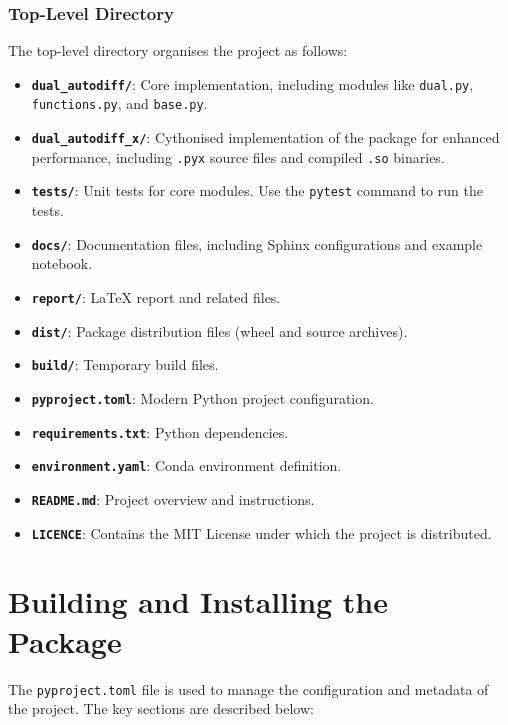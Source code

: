 \documentclass[a4paper,12pt]{article}
\begin{document}
    \subsubsection{Top-Level Directory}
    The top-level directory organises the project as follows:
    \begin{itemize}
        \item \textbf{\texttt{dual\_autodiff/}}: Core implementation, including modules like \texttt{dual.py}, \texttt{functions.py}, and \texttt{base.py}.
        \item \textbf{\texttt{dual\_autodiff\_x/}}: Cythonised implementation of the package for enhanced performance, including \texttt{.pyx} source files and compiled \texttt{.so} binaries.
        \item \textbf{\texttt{tests/}}: Unit tests for core modules. Use the \texttt{pytest} command to run the tests.
        \item \textbf{\texttt{docs/}}: Documentation files, including Sphinx configurations and example notebook.
        \item \textbf{\texttt{report/}}: LaTeX report and related files.
        \item \textbf{\texttt{dist/}}: Package distribution files (wheel and source archives).
        \item \textbf{\texttt{build/}}: Temporary build files.
        \item \textbf{\texttt{pyproject.toml}}: Modern Python project configuration.
        \item \textbf{\texttt{requirements.txt}}: Python dependencies.
        \item \textbf{\texttt{environment.yaml}}: Conda environment definition.
        \item \textbf{\texttt{README.md}}: Project overview and instructions.
        \item \textbf{\texttt{LICENCE}}: Contains the MIT License under which the project is distributed.
    \end{itemize}

    \section{Building and Installing the Package}

    The \texttt{pyproject.toml} file is used to manage the configuration and metadata of the project. The key sections are described below:
    
\end{document}
